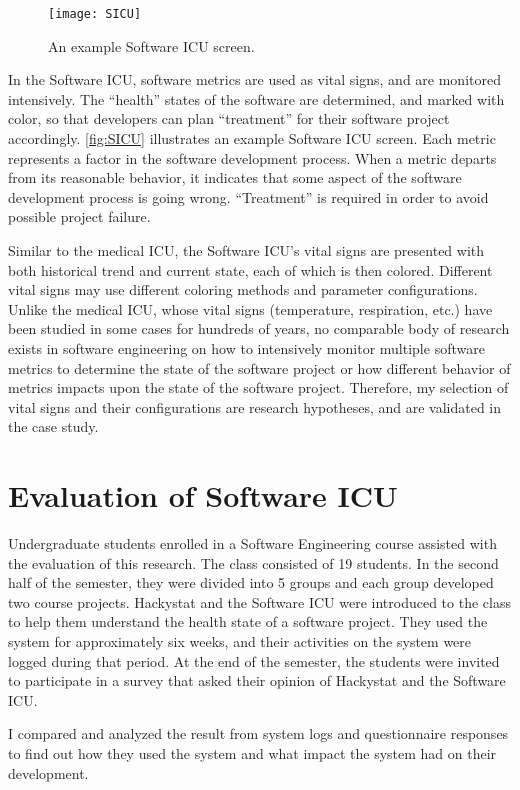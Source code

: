 \begin{figure}[htbp]
   \centering
   \texttt{[image: SICU]}
   \caption{An example Software ICU screen.}
   \label{fig:SICU}
\end{figure}


In the Software ICU, software metrics are used as vital signs, and are monitored intensively. The ``health'' states of the software are determined, and marked with color, so that developers can plan ``treatment'' for their software project accordingly. \autoref{fig:SICU} illustrates an example Software ICU screen. Each metric represents a factor in the software development process. When a metric departs from its reasonable behavior, it indicates that some aspect of the software development process is going wrong. ``Treatment'' is required  in order to avoid possible project failure.
 
Similar to the medical ICU, the Software ICU's vital signs are presented with both historical trend and current state, each of which is then colored. Different vital signs may use different coloring methods and parameter configurations. Unlike the medical ICU, whose vital signs (temperature, respiration, etc.) have been studied in some cases for hundreds of years, no comparable body of research exists in software engineering on how to intensively monitor multiple software metrics to determine the state of the software project or how different behavior of metrics impacts upon the state of the software project. Therefore, my selection of vital signs and their configurations are research hypotheses, and are validated in the case study.

\section{Evaluation of Software ICU}
Undergraduate students enrolled in a Software Engineering course assisted with the evaluation of this research. The class consisted of 19 students. In the second half of the semester, they were divided into 5 groups and each group developed two course projects. Hackystat and the Software ICU were introduced to the class to help them understand the health state of a software project. They used the system for approximately six weeks, and their activities on the system were logged during that period. At the end of the semester, the students were invited to participate in a survey that asked their opinion of Hackystat and the Software ICU.

I compared and analyzed the result from system logs and questionnaire responses to find out how they used the system and what impact the system had on their development.

